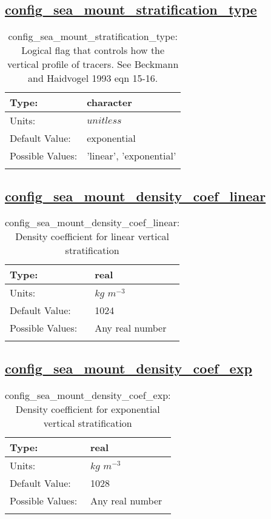 \subsection[config\_sea\_mount\_stratification\_type]{\hyperref[sec:nm_tab_sea_mount]{config\_sea\_mount\_stratification\_type}}
\label{subsec:nm_sec_config_sea_mount_stratification_type}
\begin{center}
\begin{longtable}{| p{2.0in} || p{4.0in} |}
    \hline
    Type: & character \\
    \hline
    Units: & $unitless$ \\
    \hline
    Default Value: & exponential \\
    \hline
    Possible Values: & 'linear', 'exponential' \\
    \hline
    \caption{config\_sea\_mount\_stratification\_type: Logical flag that controls how the vertical profile of tracers.  See Beckmann and Haidvogel 1993 eqn 15-16.}
\end{longtable}
\end{center}
\subsection[config\_sea\_mount\_density\_coef\_linear]{\hyperref[sec:nm_tab_sea_mount]{config\_sea\_mount\_density\_coef\_linear}}
\label{subsec:nm_sec_config_sea_mount_density_coef_linear}
\begin{center}
\begin{longtable}{| p{2.0in} || p{4.0in} |}
    \hline
    Type: & real \\
    \hline
    Units: & $kg$ $m^{-3}$ \\
    \hline
    Default Value: & 1024 \\
    \hline
    Possible Values: & Any real number \\
    \hline
    \caption{config\_sea\_mount\_density\_coef\_linear: Density coefficient for linear vertical stratification}
\end{longtable}
\end{center}
\subsection[config\_sea\_mount\_density\_coef\_exp]{\hyperref[sec:nm_tab_sea_mount]{config\_sea\_mount\_density\_coef\_exp}}
\label{subsec:nm_sec_config_sea_mount_density_coef_exp}
\begin{center}
\begin{longtable}{| p{2.0in} || p{4.0in} |}
    \hline
    Type: & real \\
    \hline
    Units: & $kg$ $m^{-3}$ \\
    \hline
    Default Value: & 1028 \\
    \hline
    Possible Values: & Any real number \\
    \hline
    \caption{config\_sea\_mount\_density\_coef\_exp: Density coefficient for exponential vertical stratification}
\end{longtable}
\end{center}
